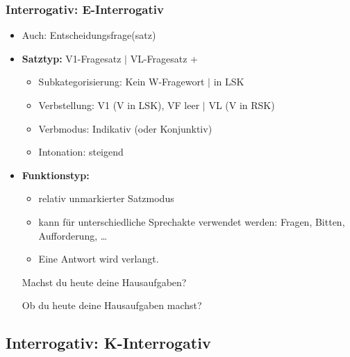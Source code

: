 \begin{frame}
\frametitle{Interrogativ: E-Interrogativ}

\begin{itemize}
	\item Auch: Entscheidungsfrage(satz)
	\item \textbf{Satztyp:} V1-Fragesatz $|$ VL-Fragesatz + 
	\begin{itemize}
		\item Subkategorisierung: Kein W-Fragewort $|$  in LSK
		\item Verbstellung: V1 (V in LSK), VF leer $|$  VL (V in RSK)
		\item Verbmodus: Indikativ (oder Konjunktiv)
		\item Intonation: steigend
	\end{itemize}
	\item \textbf{Funktionstyp:}
	\begin{itemize}
		\item relativ unmarkierter Satzmodus
		\item kann für unterschiedliche Sprechakte verwendet werden: Fragen, Bitten, Aufforderung, \dots
		\item Eine Antwort wird verlangt.
	\end{itemize}
	
	\ea Machst du heute deine Hausaufgaben?
	\z
	
	\ea Ob du heute deine Hausaufgaben machst?
	\z
	
\end{itemize}

\end{frame}


\subsection{Interrogativ: K-Interrogativ}


